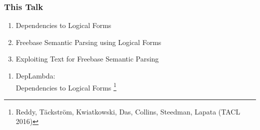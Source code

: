 \documentclass[mathserif,12pt]{beamer}
\newcommand\blfootnote[1]{%
  \begingroup
  \renewcommand\thefootnote{}\footnote{#1}%
  \addtocounter{footnote}{-1}%
  \endgroup
}
\begin{document}
\begin{frame}
\frametitle{This Talk}
\large 
\begin{enumerate}
 \item Dependencies to Logical Forms
 
 \vspace{2em}
 \item Freebase Semantic Parsing using Logical Forms
 
 \vspace{2em}
 \item Exploiting Text for Freebase Semantic Parsing
\end{enumerate}

\end{frame}

\begin{frame}
\Large
\centering
\vspace{1.5em}
\begin{enumerate}
 \item DepLambda: \\
 Dependencies to Logical Forms \blfootnote{\color{blue} Reddy, T\"ackstr\"om, Kwiatkowski, Das, Collins, Steedman, Lapata (TACL 2016)}
\end{enumerate}
\end{frame}
\end{document}
